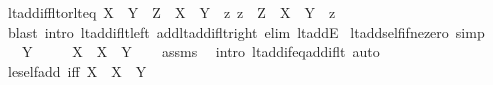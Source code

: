 \begin{isabellebody}
\endisatagproof
{\isafoldproof}%
%
\isadelimproof
\isanewline
%
\endisadelimproof
\isanewline
{}\isamarkupfalse%
\ lt{\isacharunderscore}{\kern0pt}add{\isacharunderscore}{\kern0pt}iff{\isacharunderscore}{\kern0pt}lt{\isacharunderscore}{\kern0pt}or{\isacharunderscore}{\kern0pt}lt{\isacharunderscore}{\kern0pt}eq{\isacharcolon}{\kern0pt}\ {\isachardoublequoteopen}X\ {\isacharless}{\kern0pt}\ Y\ {\isacharplus}{\kern0pt}\ Z\ {\isasymlongleftrightarrow}\ X\ {\isacharless}{\kern0pt}\ Y\ {\isasymor}\ {\isacharparenleft}{\kern0pt}{\isasymexists}z{\isachardot}{\kern0pt}\ z\ {\isacharless}{\kern0pt}\ Z\ {\isasymand}\ X\ {\isacharequal}{\kern0pt}\ Y\ {\isacharplus}{\kern0pt}\ z{\isacharparenright}{\kern0pt}{\isachardoublequoteclose}\isanewline
%
\isadelimproof
\ \ %
\endisadelimproof
%
\isatagproof
{}\isamarkupfalse%
\ {\isacharparenleft}{\kern0pt}blast\ intro{\isacharcolon}{\kern0pt}\ lt{\isacharunderscore}{\kern0pt}add{\isacharunderscore}{\kern0pt}if{\isacharunderscore}{\kern0pt}lt{\isacharunderscore}{\kern0pt}left\ add{\isacharunderscore}{\kern0pt}lt{\isacharunderscore}{\kern0pt}add{\isacharunderscore}{\kern0pt}if{\isacharunderscore}{\kern0pt}lt{\isacharunderscore}{\kern0pt}right\ elim{\isacharcolon}{\kern0pt}\ lt{\isacharunderscore}{\kern0pt}addE{\isacharparenright}{\kern0pt}%
\endisatagproof
{\isafoldproof}%
%
\isadelimproof
\isanewline
%
\endisadelimproof
\isanewline
{}\isamarkupfalse%
\ lt{\isacharunderscore}{\kern0pt}add{\isacharunderscore}{\kern0pt}self{\isacharunderscore}{\kern0pt}if{\isacharunderscore}{\kern0pt}ne{\isacharunderscore}{\kern0pt}zero\ {\isacharbrackleft}{\kern0pt}simp{\isacharbrackright}{\kern0pt}{\isacharcolon}{\kern0pt}\isanewline
\ \ \ {\isachardoublequoteopen}Y\ {\isasymnoteq}\ {}{\isachardoublequoteclose}\isanewline
\ \ \ {\isachardoublequoteopen}X\ {\isacharless}{\kern0pt}\ X\ {\isacharplus}{\kern0pt}\ Y{\isachardoublequoteclose}\isanewline
%
\isadelimproof
\ \ %
\endisadelimproof
%
\isatagproof
{}\isamarkupfalse%
\ assms\ \isamarkupfalse%
\ {\isacharparenleft}{\kern0pt}intro\ lt{\isacharunderscore}{\kern0pt}add{\isacharunderscore}{\kern0pt}if{\isacharunderscore}{\kern0pt}eq{\isacharunderscore}{\kern0pt}add{\isacharunderscore}{\kern0pt}if{\isacharunderscore}{\kern0pt}lt{\isacharparenright}{\kern0pt}\ auto%
\endisatagproof
{\isafoldproof}%
%
\isadelimproof
\isanewline
%
\endisadelimproof
\isanewline
{}\isamarkupfalse%
\ le{\isacharunderscore}{\kern0pt}self{\isacharunderscore}{\kern0pt}add\ {\isacharbrackleft}{\kern0pt}iff{\isacharbrackright}{\kern0pt}{\isacharcolon}{\kern0pt}\ {\isachardoublequoteopen}X\ {\isasymle}\ X\ {\isacharplus}{\kern0pt}\ Y{\isachardoublequoteclose}\isanewline

\end{isabellebody}

